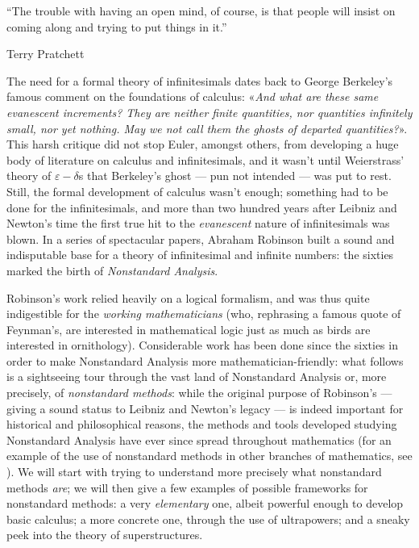 \documentclass[draft.tex]{subfiles}
\begin{document}
\epigraph{ “The trouble with having an open mind, of course, is that people will insist on coming along and trying to put things in it.” }{Terry Pratchett}
The need for a formal theory of infinitesimals dates back to George Berkeley's famous comment on the foundations of calculus: «\textit{And what are these same evanescent increments? They are neither finite quantities, nor quantities infinitely small, nor yet nothing. May we not call them the {\upshape ghosts of departed quantities}?}». This harsh critique did not stop Euler, amongst others, from developing a huge body of literature on calculus and infinitesimals, and it wasn't until Weierstrass' theory of $\varepsilon-\delta$s that Berkeley's ghost --- pun not intended --- was put to rest. Still, the formal development of calculus wasn't enough; something had to be done for the infinitesimals, and more than two hundred years after Leibniz and Newton's time the first true hit to the \textit{evanescent} nature of infinitesimals was blown. In a series of spectacular papers, Abraham Robinson built a sound and indisputable base for a theory of infinitesimal and infinite numbers: the sixties marked the birth of \emph{Nonstandard Analysis}.
\par
Robinson's work relied heavily on a logical formalism, and was thus quite indigestible for the \textit{working mathematicians} (who, rephrasing a famous quote of Feynman's, are interested in mathematical logic just as much as birds are interested in ornithology). Considerable work has been done since the sixties in order to make Nonstandard Analysis more mathematician-friendly: what follows is a sightseeing tour through the vast land of Nonstandard Analysis or, more precisely, of \textit{nonstandard methods}: while the original purpose of Robinson's --- giving a sound status to Leibniz and Newton's legacy --- is indeed important for historical and philosophical reasons, the methods and tools developed studying Nonstandard Analysis have ever since spread throughout mathematics (for an example of the use of nonstandard methods in other branches of mathematics, see \cite{dinasso}). We will start with trying to understand more precisely what nonstandard methods \textit{are}; we will then give a few examples of possible frameworks for nonstandard methods: a very \textit{elementary} one, albeit powerful enough to develop basic calculus; a more concrete one, through the use of ultrapowers; and a sneaky peek into the theory of superstructures. 
\end{document}

